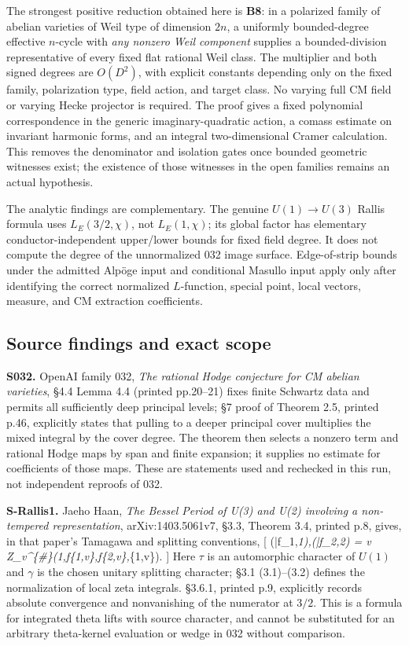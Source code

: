 \documentclass[11pt,a4paper]{article}
\theoremstyle{definition}
\begin{document}
The strongest positive reduction obtained here is \textbf{B8}: in a
polarized family of abelian varieties of Weil type of dimension \(2n\),
a uniformly bounded-degree effective \(n\)-cycle with \emph{any nonzero
Weil component} supplies a bounded-division representative of every
fixed flat rational Weil class. The multiplier and both signed degrees
are \(O(D^2)\), with explicit constants depending only on the fixed
family, polarization type, field action, and target class. No varying
full CM field or varying Hecke projector is required. The proof gives a
fixed polynomial correspondence in the generic imaginary-quadratic
action, a comass estimate on invariant harmonic forms, and an integral
two-dimensional Cramer calculation. This removes the denominator and
isolation gates once bounded geometric witnesses exist; the existence of
those witnesses in the open families remains an actual hypothesis.

The analytic findings are complementary. The genuine \(U(1)\to U(3)\)
Rallis formula uses \(L_E(3/2,\chi)\), not \(L_E(1,\chi)\); its global
factor has elementary conductor-independent upper/lower bounds for fixed
field degree. It does not compute the degree of the unnormalized 032
image surface. Edge-of-strip bounds under the admitted Alpöge input and
conditional Masullo input apply only after identifying the correct
normalized \(L\)-function, special point, local vectors, measure, and CM
extraction coefficients.

\subsection{Source findings and exact
scope}\label{source-findings-and-exact-scope}

\textbf{S032.} OpenAI family 032, \emph{The rational Hodge conjecture
for CM abelian varieties}, §4.4 Lemma 4.4 (printed pp.20--21) fixes
finite Schwartz data and permits all sufficiently deep principal levels;
§7 proof of Theorem 2.5, printed p.46, explicitly states that pulling to
a deeper principal cover multiplies the mixed integral by the cover
degree. The theorem then selects a nonzero term and rational Hodge maps
by span and finite expansion; it supplies no estimate for coefficients
of those maps. These are statements used and rechecked in this run, not
independent reproofs of 032.

\textbf{S-Rallis1.} Jaeho Haan, \emph{The Bessel Period of U(3) and U(2)
involving a non-tempered representation}, arXiv:1403.5061v7, §3.3,
Theorem 3.4, printed p.8, gives, in that paper's Tamagawa and splitting
conventions, {[}
\langle\theta(\bar f\_1,\varphi\emph{1),\theta(\bar f\_2,\varphi\emph{2)\rangle
=
\prod\emph{v Z\_v\^{}\{\#\}(1,f}\{1,v\},f}\{2,v\},\Phi}\{1,v\}). {]}
Here \(\tau\) is an automorphic character of \(U(1)\) and \(\gamma\) is
the chosen unitary splitting character; §3.1 (3.1)--(3.2) defines the
normalization of local zeta integrals. §3.6.1, printed p.9, explicitly
records absolute convergence and nonvanishing of the numerator at
\(3/2\). This is a formula for integrated theta lifts with source
character, and cannot be substituted for an arbitrary theta-kernel
evaluation or wedge in 032 without comparison.
\end{document}
